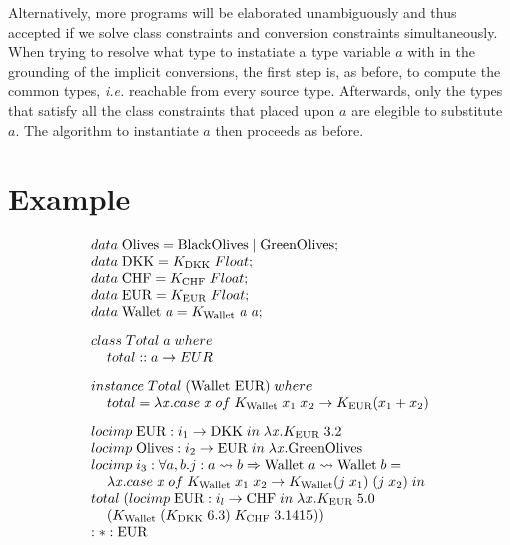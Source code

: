 Alternatively, more programs will be elaborated unambiguously and thus accepted if we solve class constraints and conversion constraints simultaneously. When trying to resolve what type to instatiate a type variable $a$ with in the grounding of the implicit conversions, the first step is, as before, to compute the common types, \textit{i.e.} reachable from every source type. Afterwards, only the types that satisfy all the class constraints that placed upon $a$ are elegible to substitute $a$. The algorithm to instantiate $a$ then proceeds as before.

\section{Example}
\begin{eg}
     \[
\begin{array}{@{\hspace{0mm}}l@{\hspace{0mm}}}
  data\;\text{Olives}=\text{BlackOlives}\;|\;\text{GreenOlives};\\
  data\;\text{DKK}=K_{\text{DKK}}\; Float;\\
  data\;\text{CHF}=K_{\text{CHF}}\; Float;\\
  data\;\text{EUR}=K_{\text{EUR}}\; Float;\\
  data\;\text{Wallet}\;\tyVar=K_{\text{Wallet}}\; \tyVar \; \tyVar;\\[3mm]
  class\;Total\;a\;where\\\phantom{xx}total :: a \to EUR \\[3mm]
  instance\;Total\;(\text{Wallet EUR})\;where\\\phantom{xx} total=\lambda \tmVar. case\;\tmVar\; of\;K_{\text{Wallet}}\;x_1\;x_2 \to K_{\text{EUR}} (x_1+x_2)\\[3mm]
  \monolocal{i_1}{\text{DKK}}{\text{EUR}}{\lambda \tmVar . K_{\text{EUR}}\;3.2}\\
  \monolocal{i_2}{\text{EUR}}{\text{Olives}}{\lambda \tmVar . \text{GreenOlives}}\\
  locimp\;i_3 :\forall a, b . j : a \rightsquigarrow b \Rightarrow \text{Wallet}\;a\rightsquigarrow \text{Wallet}\;b=\\
  \phantom{xx}\lambda \tmVar. case\;\tmVar\; of\;K_{\text{Wallet}}\;x_1\;x_2 \to K_{\text{Wallet}} (j\;x_1)\;(j\;x_2)\;in \\
  total\;(\monolocal{i_l}{\text{CHF}}{\text{EUR}}{\lambda \tmVar . K_{\text{EUR}}\;5.0}\\ \phantom{xx}(K_{\text{Wallet}}\;(K_{\text{DKK}}\;6.3)\; K_{\text{CHF}}\;3.1415))
  \\
  :*:\text{EUR}
\end{array}
\]
\label{eg7}
\end{eg}

